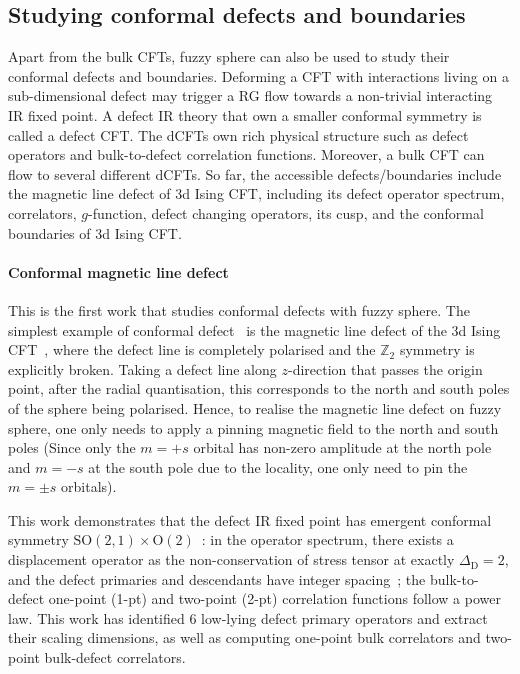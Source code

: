 \documentclass{timesjhep}
\begin{document}
\subsection{Studying conformal defects and boundaries}

Apart from the bulk CFTs, fuzzy sphere can also be used to study their conformal defects and boundaries. Deforming a CFT with interactions living on a sub-dimensional defect may trigger a RG flow towards a non-trivial interacting IR fixed point. A defect IR theory that own a smaller conformal symmetry is called a defect CFT. The dCFTs own rich physical structure such as defect operators and bulk-to-defect correlation functions. Moreover, a bulk CFT can flow to several different dCFTs. So far, the accessible defects/boundaries include the magnetic line defect of 3d Ising CFT, including its defect operator spectrum, correlators, $g$-function, defect changing operators, its cusp, and the conformal boundaries of 3d Ising CFT. 

\paragraph{Conformal magnetic line defect~\cite{Hu2023Aug}}

This is the first work that studies conformal defects with fuzzy sphere. The simplest example of conformal defect~\cite{Billo2013Defect,Billo2016Defect} is the magnetic line defect of the 3d Ising CFT~\cite{Andreas2000MagLine,Allais2014MagLine,Allais2013MagLine,Pannell2023MagLine}, where the defect line is completely polarised and the $\mathbb{Z}_2$ symmetry is explicitly broken. Taking a defect line along $z$-direction that passes the origin point, after the radial quantisation, this corresponds to the north and south poles of the sphere being polarised. Hence, to realise the magnetic line defect on fuzzy sphere, one only needs to apply a pinning magnetic field to the north and south poles (Since only the $m=+s$ orbital has non-zero amplitude at the north pole and $m=-s$ at the south pole due to the locality, one only need to pin the $m=\pm s$ orbitals). 

This work demonstrates that the defect IR fixed point has emergent conformal symmetry $\mathrm{SO}(2,1)\times\mathrm{O}(2)$~: in the operator spectrum, there exists a displacement operator as the non-conservation of stress tensor at exactly $\Delta_\mathrm{D}=2$, and the defect primaries and descendants have integer spacing~; the bulk-to-defect one-point (1-pt) and two-point (2-pt) correlation functions follow a power law. This work has identified 6 low-lying defect primary operators and extract their scaling dimensions, as well as computing one-point bulk correlators and two-point bulk-defect correlators. 
\end{document}
